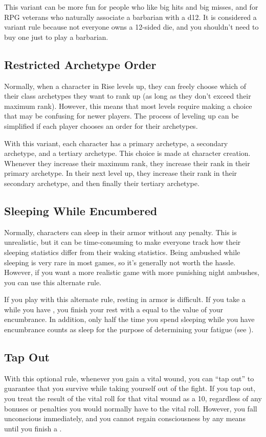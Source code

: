         This variant can be more fun for people who like big hits and big misses, and for RPG veterans who naturally associate a barbarian with a d12.
        It is considered a variant rule because not everyone owns a 12-sided die, and you shouldn't need to buy one just to play a barbarian.

    \subsection{Restricted Archetype Order}
        Normally, when a character in Rise levels up, they can freely choose which of their class archetypes they want to rank up (as long as they don't exceed their maximum rank).
        However, this means that most levels require making a choice that may be confusing for newer players.
        The process of leveling up can be simplified if each player chooses an order for their archetypes.

        With this variant, each character has a primary archetype, a secondary archetype, and a tertiary archetype.
        This choice is made at character creation.
        Whenever they increase their maximum rank, they increase their rank in their primary archetype.
        In their next level up, they increase their rank in their secondary archetype, and then finally their tertiary archetype.

    \subsection{Sleeping While Encumbered}
        Normally, characters can sleep in their armor without any penalty.
        This is unrealistic, but it can be time-consuming to make everyone track how their sleeping statistics differ from their waking statistics.
        Being ambushed while sleeping is very rare in most games, so it's generally not worth the hassle.
        However, if you want a more realistic game with more punishing night ambushes, you can use this alternate rule.

        If you play with this alternate rule, resting in armor is difficult.
        If you take a  while you have , you finish your rest with a  equal to the value of your encumbrance.
        In addition, only half the time you spend sleeping while you have encumbrance counts as sleep for the purpose of determining your fatigue (see ).

    \subsection{Tap Out}
        With this optional rule, whenever you gain a vital wound, you can ``tap out'' to guarantee that you survive while taking yourself out of the fight.
        If you tap out, you treat the result of the vital roll for that vital wound as a 10, regardless of any bonuses or penalties you would normally have to the vital roll.
        However, you fall unconscious immediately, and you cannot regain consciousness by any means until you finish a .


